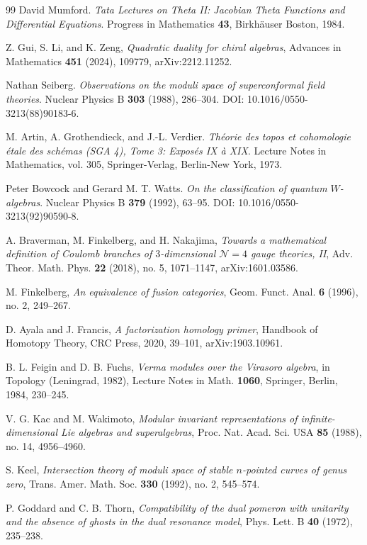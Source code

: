 \begin{thebibliography}{99}
David Mumford.
\textit{Tata Lectures on Theta II: Jacobian Theta Functions and Differential Equations}.
Progress in Mathematics \textbf{43}, Birkhäuser Boston, 1984.

 Z. Gui, S. Li, and K. Zeng, \emph{Quadratic duality for chiral algebras}, Advances in Mathematics \textbf{451} (2024), 109779, arXiv:2212.11252.

Nathan Seiberg.
\textit{Observations on the moduli space of superconformal field theories}.
Nuclear Physics B \textbf{303} (1988), 286--304.
DOI: 10.1016/0550-3213(88)90183-6.

M. Artin, A. Grothendieck, and J.-L. Verdier.
\textit{Théorie des topos et cohomologie étale des schémas (SGA 4), Tome 3:
Exposés IX à XIX}.
Lecture Notes in Mathematics, vol. 305, Springer-Verlag, Berlin-New York, 1973.
 
Peter Bowcock and Gerard M. T. Watts.
\textit{On the classification of quantum $W$-algebras}.
Nuclear Physics B \textbf{379} (1992), 63--95.
DOI: 10.1016/0550-3213(92)90590-8.

 A. Braverman, M. Finkelberg, and H. Nakajima, \emph{Towards a mathematical definition of Coulomb branches of $3$-dimensional $\mathcal{N}=4$ gauge theories, II}, Adv. Theor. Math. Phys. \textbf{22} (2018), no. 5, 1071--1147, arXiv:1601.03586.

 M. Finkelberg, \emph{An equivalence of fusion categories}, Geom. Funct. Anal. \textbf{6} (1996), no. 2, 249--267.

 D. Ayala and J. Francis, \emph{A factorization homology primer}, Handbook of Homotopy Theory, CRC Press, 2020, 39--101, arXiv:1903.10961.

 B. L. Feigin and D. B. Fuchs, \emph{Verma modules over the Virasoro algebra}, in Topology (Leningrad, 1982), Lecture Notes in Math. \textbf{1060}, Springer, Berlin, 1984, 230--245.

 V. G. Kac and M. Wakimoto, \emph{Modular invariant representations of infinite-dimensional Lie algebras and superalgebras}, Proc. Nat. Acad. Sci. USA \textbf{85} (1988), no. 14, 4956--4960.

 S. Keel, \emph{Intersection theory of moduli space of stable $n$-pointed curves of genus zero}, Trans. Amer. Math. Soc. \textbf{330} (1992), no. 2, 545--574.

 P. Goddard and C. B. Thorn, \emph{Compatibility of the dual pomeron with unitarity and the absence of ghosts in the dual resonance model}, Phys. Lett. B \textbf{40} (1972), 235--238.


\end{thebibliography}
